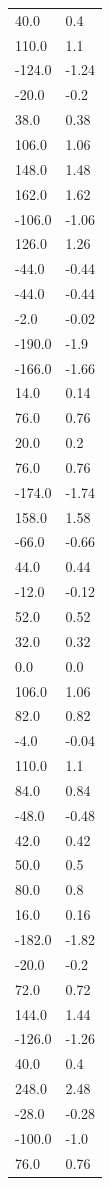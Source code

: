 \begin{longtable}{ll}
40.0 & 0.4 \\
110.0 & 1.1 \\
-124.0 & -1.24 \\
-20.0 & -0.2 \\
38.0 & 0.38 \\
106.0 & 1.06 \\
148.0 & 1.48 \\
162.0 & 1.62 \\
-106.0 & -1.06 \\
126.0 & 1.26 \\
-44.0 & -0.44 \\
-44.0 & -0.44 \\
-2.0 & -0.02 \\
-190.0 & -1.9 \\
-166.0 & -1.66 \\
14.0 & 0.14 \\
76.0 & 0.76 \\
20.0 & 0.2 \\
76.0 & 0.76 \\
-174.0 & -1.74 \\
158.0 & 1.58 \\
-66.0 & -0.66 \\
44.0 & 0.44 \\
-12.0 & -0.12 \\
52.0 & 0.52 \\
32.0 & 0.32 \\
0.0 & 0.0 \\
106.0 & 1.06 \\
82.0 & 0.82 \\
-4.0 & -0.04 \\
110.0 & 1.1 \\
84.0 & 0.84 \\
-48.0 & -0.48 \\
42.0 & 0.42 \\
50.0 & 0.5 \\
80.0 & 0.8 \\
16.0 & 0.16 \\
-182.0 & -1.82 \\
-20.0 & -0.2 \\
72.0 & 0.72 \\
144.0 & 1.44 \\
-126.0 & -1.26 \\
40.0 & 0.4 \\
248.0 & 2.48 \\
-28.0 & -0.28 \\
-100.0 & -1.0 \\
76.0 & 0.76 \\

\end{longtable}
